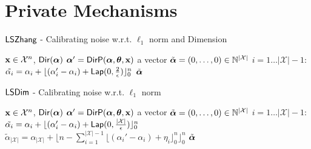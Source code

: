 \documentclass{article}
\begin{document}
\section{Private Mechanisms}
%
%
%
\begin{algorithm}
  \caption{$\mathsf{LSZhang}$\cite{zhang2016differential} - Calibrating noise w.r.t. $\ell_1$ norm and Dimension}
  \label{lapmech}
  \begin{algorithmic}
  \STATE $\textbf{x}\in\mathcal{X}^n$, $\mathsf{Dir}(\boldsymbol{\alpha})$
  \STATE {} $\boldsymbol{\alpha}' = \mathsf{DirP}(\boldsymbol{\alpha},\boldsymbol{\theta},\textbf{x})$
  \STATE {} a vector $\tilde{\boldsymbol{\alpha}} = (0, \dots, 0 )\in \mathbb{N}^{|\mathcal{X}|}$ 
  \STATE {} $i = 1 \dots |\mathcal{X}| - 1$:
  \STATE \quad {} $\tilde{\alpha_i}=\alpha_i + \lfloor{(\alpha_i' - \alpha_i)+ \mathsf{Lap}(0, \frac{2}{\epsilon}) }\rfloor^n_0$
   $\tilde{\boldsymbol{\alpha}}$
  \end{algorithmic}
\end{algorithm}
%
%
%
\begin{algorithm}
  \caption{$\mathsf{LSDim}$ - Calibrating noise w.r.t. $\ell_1$ norm}
  \label{lapmech}
  \begin{algorithmic}
  \STATE $\textbf{x}\in\mathcal{X}^n$, $\mathsf{Dir}(\boldsymbol{\alpha})$
  \STATE {} $\boldsymbol{\alpha}' = \mathsf{DirP}(\boldsymbol{\alpha},\boldsymbol{\theta},\textbf{x})$
  \STATE {} a vector $\tilde{\boldsymbol{\alpha}} = (0, \dots, 0 )\in \mathbb{N}^{|\mathcal{X}|}$ 
  \STATE {} $i = 1 \dots |\mathcal{X}| - 1$:
  \STATE \quad \quad  $\tilde{\alpha_i}=\alpha_i + \lfloor{(\alpha_i' - \alpha_i) + \mathsf{Lap}(0, \frac{|\mathcal{X}|}{\epsilon})}\rfloor^n_0$ 
  \STATE \quad $\tilde{\alpha}_{|\mathcal{X}|} = \alpha_{|\mathcal{X}|} + \lfloor n - \sum_{i = 1}^{|\mathcal{X}|-1}\lfloor{(\alpha_i' - \alpha_i) + \eta_i}\rfloor^n_0 \rfloor^n_0$
   $\tilde{\boldsymbol{\alpha}}$
  \end{algorithmic}
\end{algorithm}
%
%
%
%
%
%
\end{document}
